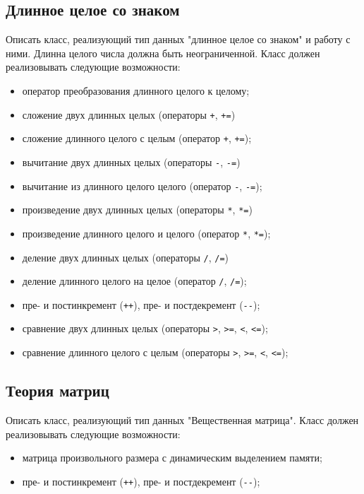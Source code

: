 \documentclass[a4paper,12pt]{article}
\begin{document}
\subsection{Длинное целое со знаком}

Описать класс, реализующий тип данных "длинное целое со знаком" и
работу с ними. Длинна целого числа должна быть неограниченной. Класс
должен реализовывать следующие возможности:

\begin{itemize}
\item оператор преобразования длинного целого к целому;
\item сложение двух длинных целых (операторы \lstinline|+|,
  \lstinline|+=|)
\item сложение длинного целого с целым (оператор \lstinline|+|,
  \lstinline|+=|);
\item вычитание двух длинных целых (операторы \lstinline|-|,
  \lstinline|-=|)
\item вычитание из длинного целого целого (оператор \lstinline|-|,
  \lstinline|-=|);
\item произведение двух длинных целых (операторы \lstinline|*|,
  \lstinline|*=|)
\item произведение длинного целого и целого (оператор \lstinline|*|,
  \lstinline|*=|);
\item деление двух длинных целых (операторы \lstinline|/|,
  \lstinline|/=|)
\item деление длинного целого на целое (оператор \lstinline|/|,
  \lstinline|/=|);
\item пре- и постинкремент (\lstinline|++|), пре- и постдекремент
  (\lstinline|--|);
\item сравнение двух длинных целых (операторы \lstinline|>|,
  \lstinline|>=|, \lstinline|<|, \lstinline|<=|);
\item сравнение длинного целого с целым (операторы \lstinline|>|,
  \lstinline|>=|, \lstinline|<|, \lstinline|<=|);
\end{itemize}

\subsection{Теория матриц}

Описать класс, реализующий тип данных "Вещественная матрица".  Класс
должен реализовывать следующие возможности:

\begin{itemize}
\item матрица произвольного размера с динамическим выделением памяти;
\item пре- и постинкремент (\lstinline|++|), пре- и постдекремент
  (\lstinline|--|);
\end{itemize}
\end{document}
